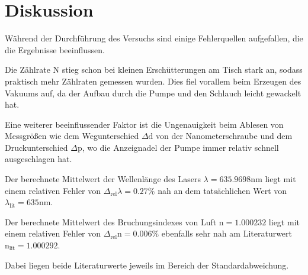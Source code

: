 \section{Diskussion}
\label{sec:Diskussion}
Während der Durchführung des Versuchs sind einige Fehlerquellen aufgefallen, die die Ergebnisse beeinflussen.

\noindent
Die Zählrate N stieg schon bei kleinen Erschütterungen am Tisch stark an, sodass praktisch mehr Zählraten gemessen wurden.
Dies fiel vorallem beim Erzeugen des Vakuums auf, da der Aufbau durch die Pumpe und den Schlauch leicht gewackelt hat.

\noindent
Eine weiterer beeinflussender Faktor ist die Ungenauigkeit beim Ablesen von Messgrößen wie dem Wegunterschied $\Delta \text{d}$ von der Nanometerschraube 
und dem Druckunterschied $\Delta \text{p}$, wo die Anzeignadel der Pumpe immer relativ schnell ausgeschlagen hat.

\noindent
Der berechnete Mittelwert der Wellenlänge des Lasers $\lambda = 635.9698 \si{\nano\meter}$ liegt mit einem relativen Fehler von  $\Delta_\text{rel}\lambda = 0.27\%$ nah an dem tatsächlichen Wert von $\lambda_\text{lit} = 635 \si{\nano\meter}$.


\noindent
Der berechnete Mittelwert des Bruchungsindexes von Luft $\text{n} = 1.000232$ liegt mit einem relativen Fehler von $\Delta_\text{rel} \text{n} = 0.006\%$ ebenfalls sehr nah am Literaturwert $\text{n}_\text{lit} = 1.000292$.

\noindent
Dabei liegen beide Literaturwerte jeweils im Bereich der Standardabweichung.



